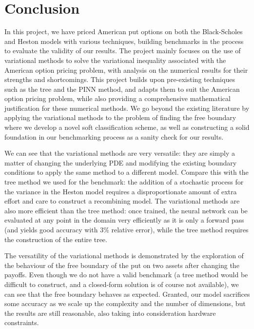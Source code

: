 \chapter{Conclusion}

In this project, we have priced American put options on both the Black-Scholes and Heston models with various techniques, building benchmarks in the process to evaluate the validity of our results. The project mainly focuses on the use of variational methods to solve the variational inequality associated with the American option pricing problem, with analysis on the numerical results for their strengths and shortcomings. This project builds upon pre-existing techniques such as the tree and the PINN method, and adapts them to suit the American option pricing problem, while also providing a comprehensive mathematical justification for these numerical methods. We go beyond the existing literature by applying the variational methods to the problem of finding the free boundary where we develop a novel soft classification scheme, as well as constructing a solid foundation in our benchmarking process as a sanity check for our results.

We can see that the variational methods are very versatile: they are simply a matter of changing the underlying PDE and modifying the existing boundary conditions to apply the same method to a different model. Compare this with the tree method we used for the benchmark: the addition of a stochastic process for the variance in the Heston model requires a disproportionate amount of extra effort and care to construct a recombining model. The variational methods are also more efficient than the tree method: once trained, the neural network can be evaluated at any point in the domain very efficiently as it is only a forward pass (and yields good accuracy with $3\%$ relative error), while the tree method requires the construction of the entire tree.

The versatility of the variational methods is demonstrated by the exploration of the behaviour of the free boundary of the put on two assets after changing the payoffs. Even though we do not have a valid benchmark (a tree method would be difficult to construct, and a closed-form solution is of course not available), we can see that the free boundary behaves as expected. Granted, our model sacrifices some accuracy as we scale up the complexity and the number of dimensions, but the results are still reasonable, also taking into consideration hardware constraints.

